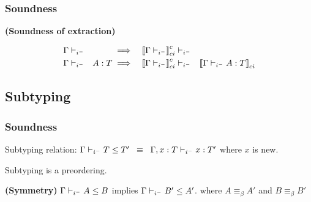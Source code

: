 \begin{frame}

\frametitle{Soundness}

\begin{theorem}

\textbf{(Soundness of extraction)}  

\begin{alignat}{4}
\Gamma &\vdash_{i^-} &  & \implies & \left\llbracket \Gamma \vdash_{i^-} \right\rrbracket_{ci}^c & \vdash_{i^-} &
\\
\Gamma &\vdash_{i^-} & A : T & \implies & \left\llbracket \Gamma \vdash_{i^-} \right\rrbracket_{ci}^c & \vdash_{i^-} & \left\llbracket  \Gamma \vdash_{i^-} A : T  \right\rrbracket_{ci}
\end{alignat}

\label{cicc-:sound}
\end{theorem}

\end{frame}

\subsection{Subtyping}

\begin{frame}
\frametitle{Soundness}
\begin{definition}
Subtyping relation:
$\Gamma \vdash_{i^-} T \leq T' \;\; \equiv \;\; \Gamma, x : T \vdash_{i^-} x : T'$  where $x$ is new.
\end{definition}

\begin{lemma}
Subtyping is a preordering.
\end{lemma}

\begin{theorem}
\textbf{(Symmetry)}
$\Gamma \vdash_{i^-} A \leq B $ implies 
$\Gamma \vdash_{i^-} B' \leq A' $. where $A \equiv_{\beta} A'$ and $B \equiv_{\beta} B'$
\label{ci:sym}
\end{theorem}

\end{frame}

